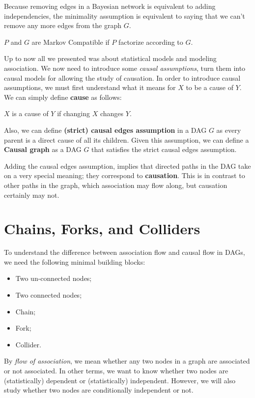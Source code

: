 Because removing edges in a Bayesian network is equivalent to adding independencies,
the minimality assumption is equivalent to saying that we can't remove any more
edges from the graph $G$.

\begin{definition}
    $P$ and $G$ are Markov Compatible if $P$ factorize according to $G$.
\end{definition}

Up to now all we presented was about statistical models and modeling association.
We now need to introduce some \textit{causal assumptions}, turn them into causal
models for allowing the study of causation. In order to introduce causal assumptions,
we must first understand what it means for $X$ to be a cause of $Y$. We can simply
define \textbf{cause} as follows:
\begin{definition}
    $X$ is a cause of $Y$ if changing $X$ changes $Y$.
\end{definition}

Also, we can define \textbf{(strict) causal edges assumption} in a DAG $G$ as
every parent is a direct cause of all its children. Given this assumption, we can
define a \textbf{Causal graph} as a DAG $G$ that satisfies the strict causal edges
assumption.

Adding the causal edges assumption, implies that directed paths in the DAG take
on a very special meaning; they correspond to \textbf{causation}. This is in
contrast to other paths in the graph, which association may flow along, but
causation certainly may not.
\section{Chains, Forks, and Colliders}
To understand the difference between association flow and causal flow in DAGs,
we need the following minimal building blocks:
\begin{itemize}
    \item Two un-connected nodes;
    \item Two connected nodes;
    \item Chain;
    \item Fork;
    \item Collider.
\end{itemize}

By \textit{flow of association}, we mean whether any two nodes in a graph are
associated or not associated. In other terms, we want to know whether two nodes
are (statistically) dependent or (statistically) independent. However, we will
also study whether two nodes are conditionally independent or not.
